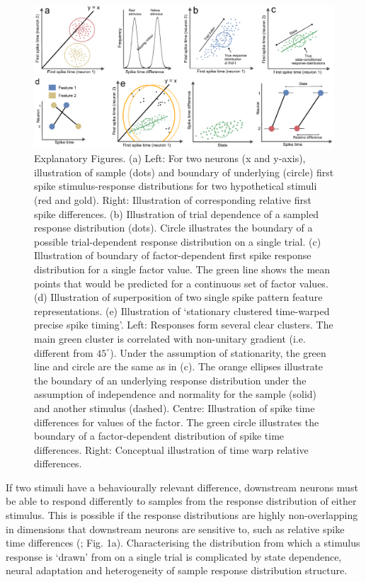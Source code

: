 \documentclass{article}
\begin{document}
\begin{figure}[t!]
\centering
\includegraphics[width=\textwidth]{Figure1.pdf}
\caption{Explanatory Figures. 
(a) Left: For two neurons (x and y-axis), illustration of sample (dots) and boundary of underlying (circle) first spike stimulus-response distributions for two hypothetical stimuli (red and gold). Right: Illustration of corresponding relative first spike differences. 
(b) Illustration of trial dependence of a sampled response distribution (dots). Circle illustrates the boundary of a possible trial-dependent response distribution on a single trial. 
(c) Illustration of boundary of factor-dependent first spike response distribution for a single factor value. The green line shows the mean points that would be predicted for a continuous set of factor values.
(d) Illustration of superposition of two single spike pattern feature representations.
(e) Illustration of `stationary clustered time-warped precise spike timing'. Left: Responses form several clear clusters. The main green cluster is correlated with non-unitary gradient (i.e. different from $45^{\circ}$). Under the assumption of stationarity, the green line and circle are the same as in (c). The orange ellipses illustrate the boundary of an underlying response distribution under the assumption of independence and normality for the sample (solid) and another stimulus (dashed). Centre: Illustration of spike time differences for values of the factor. The green circle illustrates the boundary of a factor-dependent distribution of spike time differences. Right: Conceptual illustration of time warp relative differences.}
\label{fig:fig1}
\end{figure}

If two stimuli have a behaviourally relevant difference, downstream neurons must be able to respond differently to samples from the response distribution of either stimulus. This is possible if the response distributions are highly non-overlapping in dimensions that downstream neurons are sensitive to, such as relative spike time differences (\cite{gasparini2006state, branco2010dendritic, branco2011synaptic}; Fig. 1a). Characterising the distribution from which a stimulus response is `drawn' from on a single trial is complicated by state dependence, neural adaptation and heterogeneity of sample response distribution structure.
\end{document}
